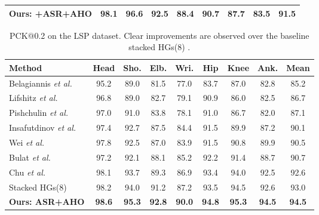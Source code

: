 \documentclass[10pt,twocolumn,letterpaper]{article}
\begin{document}
\begin{table}[htb]
\begin{center}
\begin{tabular}{@{}lcccccccc@{}}
Ours: +ASR+AHO & 98.1  & {\bf 96.6}  & {\bf 92.5}  & {\bf 88.4}  & {\bf 90.7}  & 87.7 & 83.5 & {\bf 91.5}\\
\bottomrule
\end{tabular}
\end{center}
\vspace{-10pt}
\end{table}\begin{table}[htb]
\begin{center}
\caption{PCK@0.2 on the LSP dataset. Clear improvements are observed over the baseline stacked HGs(8) \cite{newell2016stacked}.}
\label{tb:LSP}
\small
\setlength\tabcolsep{1.5pt}
\begin{tabular}{@{}lcccccccc@{}}
\toprule
Method & Head & Sho. & Elb. & Wri. & Hip & Knee & Ank. & Mean\\
\hline
Belagiannis \textit{et al.}\cite{belagiannis2017recurrent} & 95.2 & 89.0 & 81.5 & 77.0 & 83.7 & 87.0 & 82.8 & 85.2\\
Lifshitz \textit{et al.}\cite{lifshitz2016human} & 96.8 & 89.0 & 82.7 & 79.1 & 90.9 & 86.0 & 82.5 & 86.7\\
Pishchulin \textit{et al.}\cite{pishchulin2016deepcut} &  97.0 & 91.0 & 83.8 & 78.1 & 91.0 & 86.7 & 82.0 & 87.1\\
Insafutdinov \textit{et al.}\cite{insafutdinov2016deepercut}& 97.4 & 92.7 & 87.5 & 84.4 & 91.5 & 89.9 & 87.2 & 90.1\\
Wei \textit{et al.}\cite{wei2016convolutional}& 97.8 & 92.5 & 87.0 & 83.9 & 91.5 & 90.8 & 89.9 & 90.5\\
Bulat \textit{et al.}\cite{bulat2016human}& 97.2 & 92.1 & 88.1 & 85.2 & 92.2 & 91.4 & 88.7 & 90.7\\
Chu \textit{et al.}\cite{chu2017multi}& 98.1 & 93.7 & 89.3 & 86.9 &  93.4 & 94.0 & 92.5 & 92.6\\
\hline
Stacked HGs(8) \cite{newell2016stacked} & 98.2 & 94.0 & 91.2 & 87.2 & 93.5 & 94.5 & 92.6 & 93.0\\
\textbf{Ours: ASR+AHO} & \textbf{98.6} & \textbf{95.3} & \textbf{92.8} & \textbf{90.0} & \textbf{94.8} & \textbf{95.3} & \textbf{94.5} & \textbf{94.5}\\
\bottomrule
\end{tabular}
\end{center}
\vspace{-10pt}

\end{table}
\end{document}
